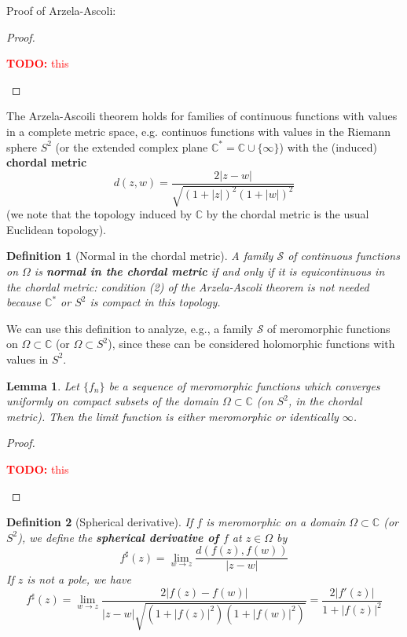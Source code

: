 \documentclass{article}
\newtheorem{lemma}{Lemma}
\newcommand{\mbb}[1]{\mathbb{#1}}
\newcommand{\mc}[1]{\mathcal{#1}}
\newtheorem{definition}{Definition}
\newcommand{\TODO}[1]{\begin{center}\huge{\textcolor{red}{\textbf{TODO:} #1}}\end{center}}
\begin{document}
Proof of Arzela-Ascoli:
\begin{proof}

\TODO{this}

\end{proof}
The Arzela-Ascoili theorem holds for families of continuous functions with values in a complete metric space, e.g. continuos functions with values in the Riemann sphere \(S^2\) (or the extended complex plane \(\mbb{C}^* = \mbb{C} \cup \{\infty\}\)) with the (induced) \textbf{chordal metric}
\begin{equation}d(z, w) = \frac{2|z - w|}{\sqrt{(1 + |z|)^2(1 + |w|)^2}}\end{equation}
(we note that the topology induced by \(\mbb{C}\) by the chordal metric is the usual Euclidean topology).
\begin{definition}[Normal in the chordal metric]
A family \(\mc{S}\) of continuous functions on \(\Omega\) is \textbf{normal in the chordal metric} if and only if it is equicontinuous in the chordal metric: condition (2) of the Arzela-Ascoli theorem is not needed because \(\mbb{C}^*\) or \(S^2\) is compact in this topology.
\end{definition}
We can use this definition to analyze, e.g., a family \(\mc{S}\) of meromorphic functions on \(\Omega \subset \mbb{C}\) (or \(\Omega \subset S^2\)), since these can be considered holomorphic functions with values in \(S^2\).
\begin{lemma}
Let \(\{f_n\}\) be a sequence of meromorphic functions which converges uniformly on compact subsets of the domain \(\Omega \subset \mbb{C}\) (on \(S^2\), in the chordal metric). Then the limit function is either meromorphic or identically \(\infty\).
\end{lemma}
\begin{proof}
\TODO{this}
\end{proof}
\begin{definition}[Spherical derivative]
If \(f\) is meromorphic on a domain \(\Omega \subset \mbb{C}\) (or \(S^2\)), we define the \textbf{spherical derivative of \(f\)} at \(z \in \Omega\) by
\begin{equation}f^\sharp(z) = \lim_{w \to z}\frac{d(f(z), f(w))}{|z - w|}\end{equation}
If \(z\) is not a pole, we have
\begin{equation}f^\sharp(z) = \lim_{w \to z}\frac{2|f(z) - f(w)|}{|z - w|\sqrt{(1 + |f(z)|^2)(1 + |f(w)|^2)}} = \frac{2|f'(z)|}{1 + |f(z)|^2}\end{equation}
\end{definition}
\end{document}
